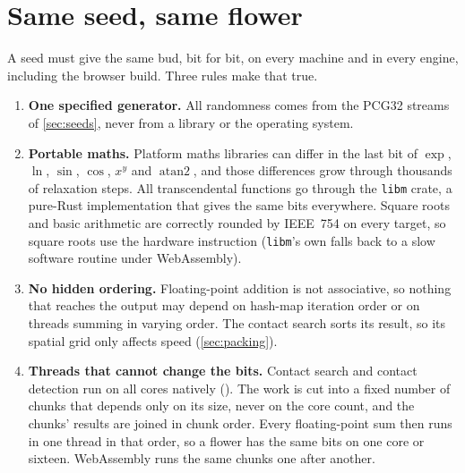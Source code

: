 \section{Same seed, same flower}\label{sec:determinism}

A seed must give the same bud, bit for bit, on every machine and in every
engine, including the browser build. Three rules make that true.

\begin{enumerate}[leftmargin=*]
\item \textbf{One specified generator.} All randomness comes from the PCG32
  streams of \cref{sec:seeds}, never from a library or the operating system.
\item \textbf{Portable maths.} Platform maths libraries can differ in the last
  bit of $\exp$, $\ln$, $\sin$, $\cos$, $x^y$ and $\operatorname{atan2}$, and
  those differences grow through thousands of relaxation steps. All
  transcendental functions go through the \texttt{libm} crate, a pure-Rust
  implementation that gives the same bits everywhere. Square roots and basic
  arithmetic are correctly rounded by IEEE~754 on every target, so square
  roots use the hardware instruction (\texttt{libm}'s own falls back to a slow
  software routine under WebAssembly).
\item \textbf{No hidden ordering.} Floating-point addition is not associative,
  so nothing that reaches the output may depend on hash-map iteration order or
  on threads summing in varying order. The contact search sorts its result,
  so its spatial grid only affects speed (\cref{sec:packing}).
\item \textbf{Threads that cannot change the bits.} Contact search and
  contact detection run on all cores natively (). The
  work is cut into a fixed number of chunks that depends only on its size,
  never on the core count, and the chunks' results are joined in chunk order.
  Every floating-point sum then runs in one thread in that order, so a flower
  has the same bits on one core or sixteen. WebAssembly runs the same chunks
  one after another.
\end{enumerate}

